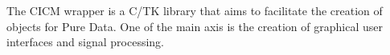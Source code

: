 The C\-I\-C\-M wrapper is a C/\-T\-K library that aims to facilitate the creation of objects for Pure Data. One of the main axis is the creation of graphical user interfaces and signal processing. 
